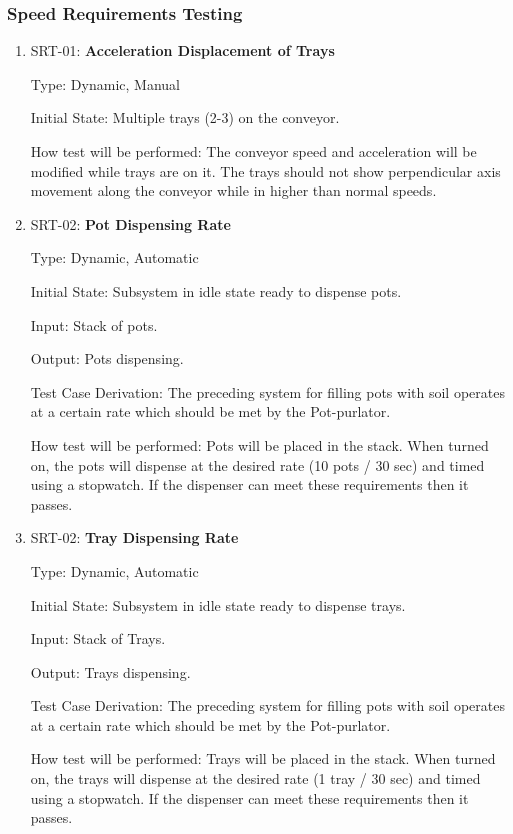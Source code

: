 \documentclass[12pt, titlepage]{article}
\begin{document}
\subsubsection{Speed Requirements Testing}
\begin{enumerate}
  \item{SRT-01: \textbf{Acceleration Displacement of Trays}}
  
Type: Dynamic, Manual

Initial State: Multiple trays (2-3) on the conveyor.

How test will be performed: The conveyor speed and acceleration will be modified while 
trays are on it. The trays should not show perpendicular axis movement along the conveyor
while in higher than normal speeds.
\\
\item{SRT-02: \textbf{Pot Dispensing Rate}}
  
Type: Dynamic, Automatic

Initial State: Subsystem in idle state ready to dispense pots.

Input: Stack of pots.

Output: Pots dispensing.

Test Case Derivation: The preceding system for filling pots with soil operates at a certain rate which
should be met by the Pot-purlator.

How test will be performed: Pots will be placed in the stack. When turned on, the pots will dispense
at the desired rate (10 pots / 30 sec) and timed using a stopwatch. If the dispenser can meet
these requirements then it passes.
\\
\item{SRT-02: \textbf{Tray Dispensing Rate}}
  
Type: Dynamic, Automatic

Initial State: Subsystem in idle state ready to dispense trays.

Input: Stack of Trays.

Output: Trays dispensing.

Test Case Derivation: The preceding system for filling pots with soil operates at a certain rate which
should be met by the Pot-purlator.

How test will be performed: Trays will be placed in the stack. When turned on, the trays will dispense
at the desired rate (1 tray / 30 sec) and timed using a stopwatch. If the dispenser can meet
these requirements then it passes.

\end{enumerate}
\end{document}

